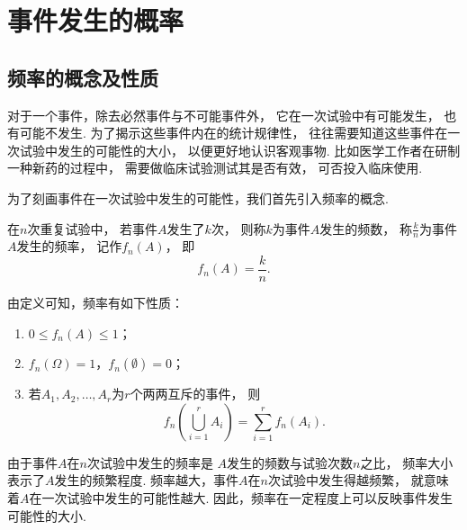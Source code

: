 \section{事件发生的概率}
\subsection{频率的概念及性质}
对于一个事件，除去必然事件与不可能事件外，
它在一次试验中有可能发生，
也有可能不发生.
为了揭示这些事件内在的统计规律性，
往往需要知道这些事件在一次试验中发生的可能性的大小，
以便更好地认识客观事物.
比如医学工作者在研制一种新药的过程中，
需要做临床试验测试其是否有效，
可否投入临床使用.

为了刻画事件在一次试验中发生的可能性，我们首先引入频率的概念.

\begin{definition}
在\(n\)次重复试验中，
若事件\(A\)发生了\(k\)次，
则称\(k\)为事件\(A\)发生的频数，
称\(\frac{k}{n}\)为事件\(A\)发生的频率，
记作\(f_n(A)\)，
即\begin{equation*}
	f_n(A) = \frac{k}{n}.
\end{equation*}
\end{definition}

\begin{property}
由定义可知，频率有如下性质：
\begin{enumerate}
	\item \(0 \leq f_n(A) \leq 1\)；

	\item \(f_n(\Omega) = 1\)，\(f_n(\emptyset) = 0\)；

	\item 若\(A_1,A_2,\dotsc,A_r\)为\(r\)个两两互斥的事件，
	则\begin{equation*}
		f_n\left( \bigcup_{i=1}^r A_i \right)
		= \sum_{i=1}^r f_n(A_i).
	\end{equation*}
\end{enumerate}
\end{property}

由于事件\(A\)在\(n\)次试验中发生的频率是
\(A\)发生的频数与试验次数\(n\)之比，
频率大小表示了\(A\)发生的频繁程度.
频率越大，事件\(A\)在\(n\)次试验中发生得越频繁，
就意味着\(A\)在一次试验中发生的可能性越大.
因此，频率在一定程度上可以反映事件发生可能性的大小.

